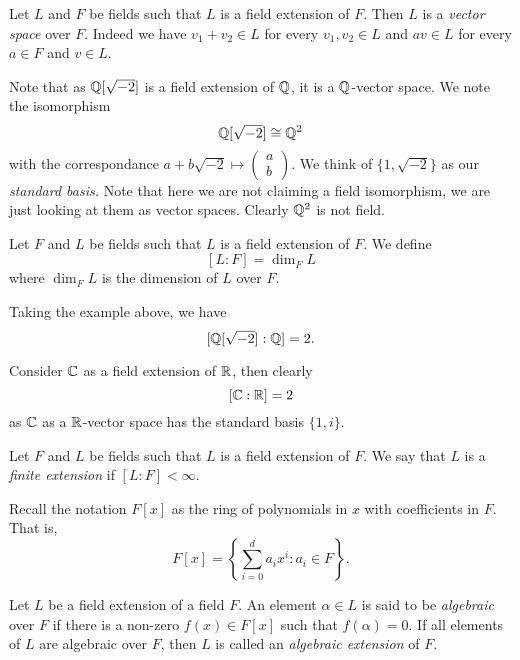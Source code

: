 Let $L$ and $F$ be fields such that $L$ is a field extension of $F$.
Then $L$ is a \emph{vector space} over $F$.
Indeed we have
$v_1 + v_2 \in L$ for every $v_1, v_2 \in L$ and
$av \in L$ for every $a \in F$ and $v \in L$.

\begin{example}[]
	Note that as $\mathbb{Q}[\sqrt{-2}]$ is a field extension of $\mathbb{Q}$, it is a 
	$\mathbb{Q}$-vector space. 
	We note the isomorphism \[
		\mathbb{Q}[\sqrt{-2}] \cong \mathbb{Q}^2
	\]
	with the correspondance $
		a + b\sqrt{-2} \mapsto \begin{pmatrix} a \\ b \end{pmatrix}
	$. We think of $\{1, \sqrt{-2}\}$ as our \emph{standard basis.}
	Note that here we are not claiming a field isomorphism, we are just
	looking at them as vector spaces.
	Clearly $\mathbb{Q}^2$ is not field.
\end{example}

\begin{definition}[]
	Let $F$ and $L$ be fields such that $L$ is a field extension of $F$.
	We define \[
		[L:F] = \dim_F L
	\]
	where $\dim_F L$ is the dimension of $L$ over $F$.
\end{definition}

\begin{example}
	Taking the example above, we have \[
		[\mathbb{Q}[\sqrt{-2}] : \mathbb{Q}] = 2.
	\]
\end{example}


\begin{example}[]
	Consider $\mathbb{C}$ as a field extension of $\mathbb{R}$, then clearly \[
		[\mathbb{C}: \mathbb{R}] = 2
	\]
	as $\mathbb{C}$ as a $\mathbb{R}$-vector space has the standard basis $\{1, i\}$.
\end{example}

\begin{definition}[]
	Let $F$ and $L$ be fields such that $L$ is a field extension of $F$.
	We say that $L$ is a \emph{finite extension} if $[L:F] < \infty$.
\end{definition}

Recall the notation $F[x]$ as the ring of polynomials in $x$ with
coefficients in $F$. That is, \[
	F[x] = \left\{ \sum_{i=0}^d a_ix^i: a_i \in F \right\}.
\]

\begin{definition}[]
	Let $L$ be a field extension of a field $F$.
	An element $\alpha \in L$ is said to be \emph{algebraic} over $F$ if
	there is a non-zero $f(x) \in F[x]$ such that $f(\alpha) = 0$.
	If all elements of $L$ are algebraic over $F$, then $L$ is called an
	\emph{algebraic extension} of $F$.
\end{definition}

